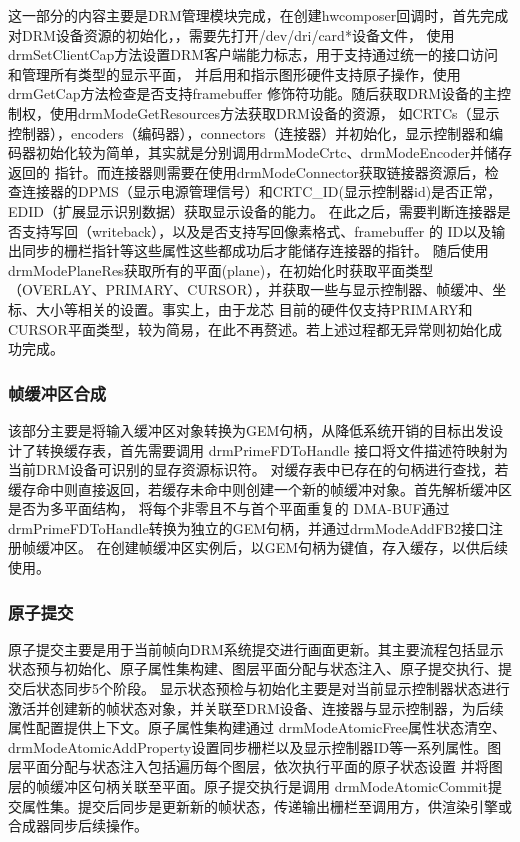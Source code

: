 这一部分的内容主要是DRM管理模块完成，在创建hwcomposer回调时，首先完成对DRM设备资源的初始化，，需要先打开/dev/dri/card*设备文件，
使用drmSetClientCap方法设置DRM客户端能力标志，用于支持通过统一的接口访问和管理所有类型的显示平面，
并启用和指示图形硬件支持原子操作，使用drmGetCap方法检查是否支持framebuffer 修饰符功能。随后获取DRM设备的主控制权，使用drmModeGetResources方法获取DRM设备的资源，
如CRTCs（显示控制器），encoders（编码器），connectors（连接器）并初始化，显示控制器和编码器初始化较为简单，其实就是分别调用drmModeCrtc、drmModeEncoder并储存返回的
指针。而连接器则需要在使用drmModeConnector获取链接器资源后，检查连接器的DPMS（显示电源管理信号）和CRTC\_ID(显示控制器id)是否正常，EDID（扩展显示识别数据）获取显示设备的能力。
在此之后，需要判断连接器是否支持写回（writeback），以及是否支持写回像素格式、framebuffer 的 ID以及输出同步的栅栏指针等这些属性这些都成功后才能储存连接器的指针。
随后使用drmModePlaneRes获取所有的平面(plane)，在初始化时获取平面类型（OVERLAY、PRIMARY、CURSOR），并获取一些与显示控制器、帧缓冲、坐标、大小等相关的设置。事实上，由于龙芯
目前的硬件仅支持PRIMARY和CURSOR平面类型，较为简易，在此不再赘述。若上述过程都无异常则初始化成功完成。

\subsubsection{帧缓冲区合成}
该部分主要是将输入缓冲区对象转换为GEM句柄，从降低系统开销的目标出发设计了转换缓存表，首先需要调用 drmPrimeFDToHandle 接口将文件描述符映射为当前DRM设备可识别的显存资源标识符。
对缓存表中已存在的句柄进行查找，若缓存命中则直接返回，若缓存未命中则创建一个新的帧缓冲对象。首先解析缓冲区是否为多平面结构，
将每个非零且不与首个平面重复的 DMA-BUF通过drmPrimeFDToHandle转换为独立的GEM句柄，并通过drmModeAddFB2接口注册帧缓冲区。
在创建帧缓冲区实例后，以GEM句柄为键值，存入缓存，以供后续使用。

\subsubsection{原子提交}
原子提交主要是用于当前帧向DRM系统提交进行画面更新。其主要流程包括显示状态预与初始化、原子属性集构建、图层平面分配与状态注入、原子提交执行、提交后状态同步5个阶段。
显示状态预检与初始化主要是对当前显示控制器状态进行激活并创建新的帧状态对象，并关联至DRM设备、连接器与显示控制器，为后续属性配置提供上下文。原子属性集构建通过
drmModeAtomicFree属性状态清空、drmModeAtomicAddProperty设置同步栅栏以及显示控制器ID等一系列属性。图层平面分配与状态注入包括遍历每个图层，依次执行平面的原子状态设置
并将图层的帧缓冲区句柄关联至平面。原子提交执行是调用 drmModeAtomicCommit提交属性集。提交后同步是更新新的帧状态，传递输出栅栏至调用方，供渲染引擎或合成器同步后续操作。

